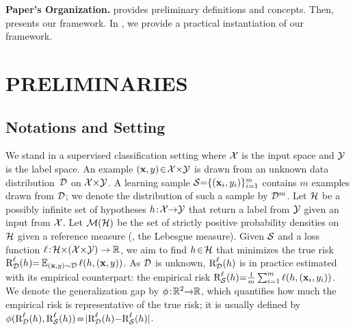 \documentclass[twoside]{article}
\theoremstyle{plain}
\begin{document}
\textbf{Paper's Organization.}
 provides preliminary definitions and concepts. 
Then,  presents our framework.
In , we provide a practical instantiation of our framework.

\section{PRELIMINARIES}
\label{sec:setting}

\subsection{Notations and Setting}
\label{sec:notations}

We stand in a supervised classification setting where $\mathcal{X}$ is the input space and $\mathcal{Y}$ is the label space.
An example $(\mathbf{x}, y)\!\in\! \mathcal{X}{\times}\mathcal{Y}$ is drawn from an unknown data distribution~$\mathcal{D}$ on $\mathcal{X}{\times}\mathcal{Y}$.
A learning sample $\mathcal{S}{=}\{(\mathbf{x}_i, y_i)\}_{i=1}^m$ contains $m$ examples drawn \iid from $\mathcal{D}$; we denote the distribution of such a sample by $\mathcal{D}^m$.
Let $\mathcal{H}$ be a possibly infinite set of hypotheses $h\!:\!\mathcal{X}{\to}\mathcal{Y}$ that return a label from $\mathcal{Y}$ given an input from $\mathcal{X}$. 
Let $\mathcal{M}(\mathcal{H})$ be the set of strictly positive probability densities on $\mathcal{H}$ given a reference measure (\eg, the Lebesgue measure).
Given $\mathcal{S}$ and a loss function $\ell\!:\! \mathcal{H}{\times}(\mathcal{X}{\times}\mathcal{Y})\to\mathbb{R}$, we aim to find $h \!\in\! \mathcal{H}$ that minimizes the true risk $\text{R}^{\ell}_{\mathcal{D}}(h) {=} \operatorname*{\mathbb{E}}_{(\mathbf{x},y)\sim\mathcal{D}} \ell(h, (\mathbf{x},y))$.
As $\mathcal{D}$ is unknown, $\text{R}^{\ell}_{\mathcal{D}} (h)$ is in practice estimated with its empirical counterpart: the empirical risk $\text{R}^{\ell}_{\mathcal{S}}(h) {=} \frac{1}{m}\sum_{i=1}^{m}\ell(h, (\mathbf{x}_i, y_i))$.
We denote the generalization gap by $\phi\!:\! \mathbb{R}^2{\to}\mathbb{R}$, which quantifies how much the empirical risk is representative of the true risk; it is usually defined by $\phi(\text{R}^{\ell}_{\mathcal{D}}(h), \text{R}^{\ell}_{\mathcal{S}}(h))\!=\!\vert\text{R}^{\ell}_{\mathcal{D}}(h){-}\text{R}^{\ell}_{\mathcal{S}}(h)\vert$.
\end{document}
